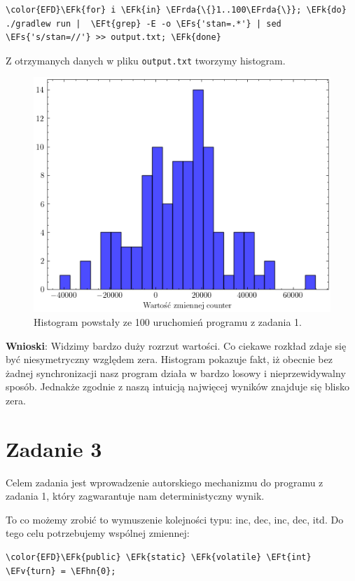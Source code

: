 \documentclass[11pt]{article}
\newcommand{\EFs}[1]{\textcolor{EFs}{#1}} %
\newcommand{\EFk}[1]{\textbf{#1}} %
\newcommand{\EFv}[1]{#1} %
\newcommand{\EFt}[1]{\textbf{#1}} %
\newcommand{\EFhn}[1]{\textcolor{EFhn}{\textbf{#1}}} %
\newcommand{\EFrda}[1]{\textcolor{EFrda}{#1}} %
\begin{document}
\begin{Code}
\begin{Verbatim}
\color{EFD}\EFk{for} i \EFk{in} \EFrda{\{}1..100\EFrda{\}}; \EFk{do} ./gradlew run |  \EFt{grep} -E -o \EFs{'stan=.*'} | sed \EFs{'s/stan=//'} >> output.txt; \EFk{done}
\end{Verbatim}
\end{Code}

Z otrzymanych danych w pliku \texttt{output.txt} tworzymy histogram.

\begin{figure}[H]
\centering
\includegraphics[width=.9\linewidth]{histogram.png}
\caption{\label{}Histogram powstały ze 100 uruchomień programu z zadania 1.}
\end{figure}

\textbf{Wnioski}: Widzimy bardzo duży rozrzut wartości. Co ciekawe rozkład zdaje się być niesymetryczny względem zera.
Histogram pokazuje fakt, iż obecnie bez żadnej synchronizacji nasz program działa w bardzo losowy i
nieprzewidywalny sposób. Jednakże zgodnie z naszą intuicją najwięcej wyników znajduje się blisko zera.
\section*{Zadanie 3}
\label{sec:org3574e5c}
Celem zadania jest wprowadzenie autorskiego mechanizmu do programu z zadania 1, który
zagwarantuje nam deterministyczny wynik.

To co możemy zrobić to wymuszenie kolejności typu: inc, dec, inc, dec, itd.
Do tego celu potrzebujemy wspólnej zmiennej:

\begin{Code}
\begin{Verbatim}
\color{EFD}\EFk{public} \EFk{static} \EFk{volatile} \EFt{int} \EFv{turn} = \EFhn{0};
\end{Verbatim}
\end{Code}
\end{document}
